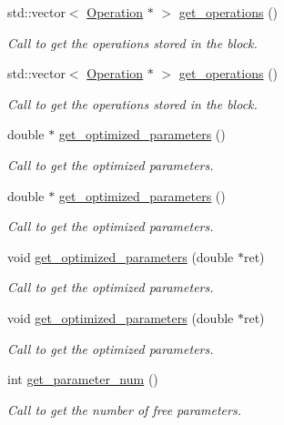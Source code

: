 \begin{DoxyCompactItemize}
std\+::vector$<$ \hyperlink{class_operation}{Operation} $\ast$ $>$ \hyperlink{class_operation__block_a489d0c5758732ca49d5f5aca225e9318}{get\+\_\+operations} ()
\begin{DoxyCompactList}\small\item\em Call to get the operations stored in the block. \end{DoxyCompactList}\item 
std\+::vector$<$ \hyperlink{class_operation}{Operation} $\ast$ $>$ \hyperlink{class_operation__block_aecb9b674dfd43456605a6c13dfba3afb}{get\+\_\+operations} ()
\begin{DoxyCompactList}\small\item\em Call to get the operations stored in the block. \end{DoxyCompactList}\item 
double $\ast$ \hyperlink{class_decomposition___base_ae2dd23fc79127ca9d25eafeb1137d094}{get\+\_\+optimized\+\_\+parameters} ()
\begin{DoxyCompactList}\small\item\em Call to get the optimized parameters. \end{DoxyCompactList}\item 
double $\ast$ \hyperlink{class_decomposition___base_a27c8d07322621ccd644aaff8af667809}{get\+\_\+optimized\+\_\+parameters} ()
\begin{DoxyCompactList}\small\item\em Call to get the optimized parameters. \end{DoxyCompactList}\item 
void \hyperlink{class_decomposition___base_ae9d74e7137a05ceda5d6efeba8cc6c8e}{get\+\_\+optimized\+\_\+parameters} (double $\ast$ret)
\begin{DoxyCompactList}\small\item\em Call to get the optimized parameters. \end{DoxyCompactList}\item 
void \hyperlink{class_decomposition___base_ae9d74e7137a05ceda5d6efeba8cc6c8e}{get\+\_\+optimized\+\_\+parameters} (double $\ast$ret)
\begin{DoxyCompactList}\small\item\em Call to get the optimized parameters. \end{DoxyCompactList}\item 
int \hyperlink{class_operation__block_af7ff4a8876a7b1c062ea2f35efac18b0}{get\+\_\+parameter\+\_\+num} ()
\begin{DoxyCompactList}\small\item\em Call to get the number of free parameters. \end{DoxyCompactList}\item 

\end{DoxyCompactItemize}
